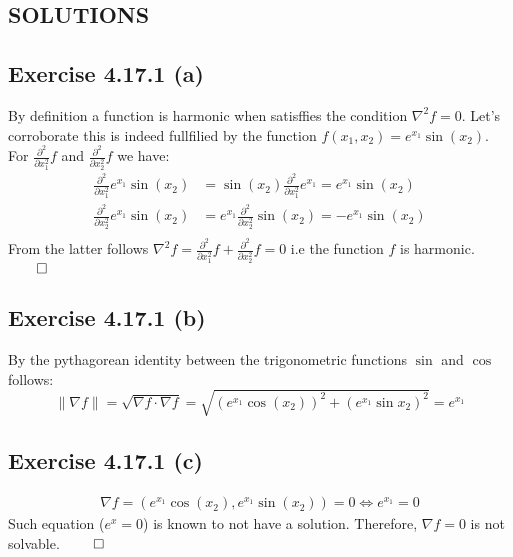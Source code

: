 \documentclass{exam}
\renewenvironment{proof}{{\noindent\itshape\ignorespaces}}{{\hfill$\qed$\\}}
\begin{document}
\newpage

\begin{center}    
    \section*{SOLUTIONS}
\end{center}

\subsection*{Exercise 4.17.1 (a)}
    By definition a function is harmonic when satisffies the condition $\nabla^{2}f = 0$. Let's corroborate this is indeed fullfilied by the function 
    $f(x_1,x_2) = e^{x_1}\sin(x_2)$. For $\frac{\partial^{2}}{ \partial x^{2}_1}f$ and $\frac{\partial^{2}}{ \partial x^{2}_2}f$ we have:\\
    \begin{proof}
        \begin{equation*}     
            \begin{aligned}
                \frac{\partial^{2}}{ \partial x^{2}_1} e^{x_1}\sin(x_2) &=  \sin(x_2)\frac{\partial^{2}}{ \partial x^{2}_1} e^{x_1} = e^{x_1}\sin(x_2)\\
                \frac{\partial^{2}}{ \partial x^{2}_2} e^{x_1}\sin(x_2) &=  e^{x_1}\frac{\partial^{2}}{ \partial x^{2}_2}\sin(x_2)  = -e^{x_1}\sin(x_2)\\
            \end{aligned}
    \end{equation*}
    From the latter follows $\nabla^{2}f = \displaystyle\frac{\partial^{2}}{ \partial x^{2}_1}f + \displaystyle\frac{\partial^{2}}{ \partial x^{2}_2}f = 0$ i.e the function $f$ is harmonic.
    \end{proof}
\subsection*{Exercise 4.17.1 (b)}
By the pythagorean identity between the trigonometric functions $\sin$ and $\cos$ follows:\\
\begin{equation*}
    \lVert \nabla f \lVert = \sqrt{\nabla f \cdot \nabla f} = \sqrt{(e^{x_1}\cos(x_2))^{2} + (e^{x_1}\sin{x_2})^{2}} = e^{x_1}
\end{equation*}
\subsection*{Exercise 4.17.1 (c)}
\begin{proof}
    \begin{equation*}     
        \begin{aligned}
            \nabla f = (e^{x_1}\cos(x_2), e^{x_1}\sin(x_2)) = 0 \iff e^{x_1} = 0 
        \end{aligned}
\end{equation*}
Such equation ($e^{x} = 0$) is known to not have a solution. Therefore, $\nabla f = 0$ is not solvable.
\end{proof}
\end{document}
